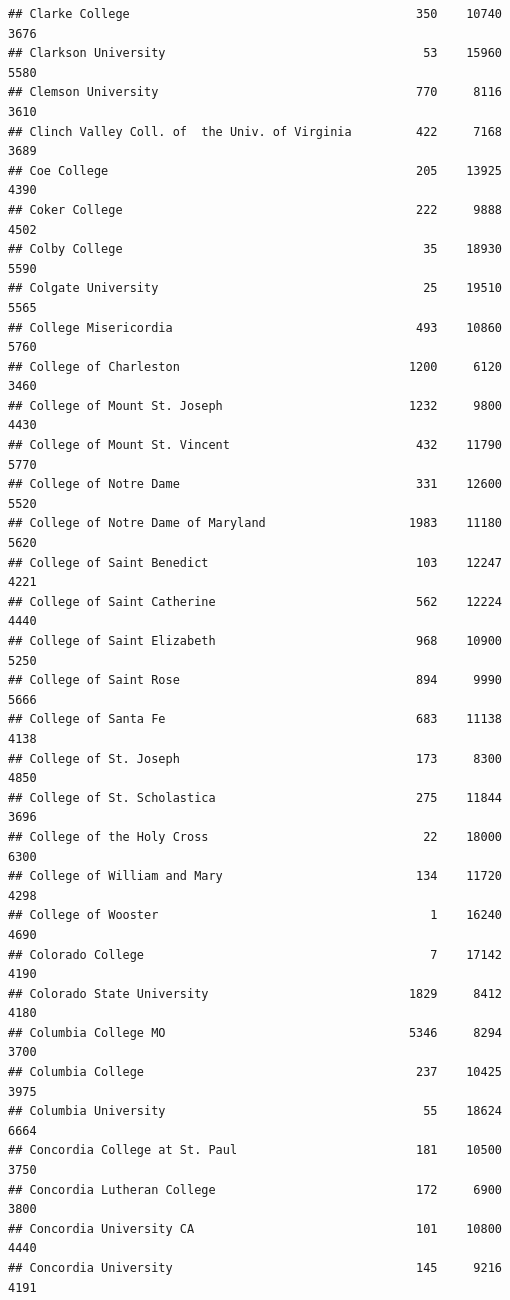\documentclass[
]{article}
\begin{document}
\begin{verbatim}
## Clarke College                                        350    10740       3676
## Clarkson University                                    53    15960       5580
## Clemson University                                    770     8116       3610
## Clinch Valley Coll. of  the Univ. of Virginia         422     7168       3689
## Coe College                                           205    13925       4390
## Coker College                                         222     9888       4502
## Colby College                                          35    18930       5590
## Colgate University                                     25    19510       5565
## College Misericordia                                  493    10860       5760
## College of Charleston                                1200     6120       3460
## College of Mount St. Joseph                          1232     9800       4430
## College of Mount St. Vincent                          432    11790       5770
## College of Notre Dame                                 331    12600       5520
## College of Notre Dame of Maryland                    1983    11180       5620
## College of Saint Benedict                             103    12247       4221
## College of Saint Catherine                            562    12224       4440
## College of Saint Elizabeth                            968    10900       5250
## College of Saint Rose                                 894     9990       5666
## College of Santa Fe                                   683    11138       4138
## College of St. Joseph                                 173     8300       4850
## College of St. Scholastica                            275    11844       3696
## College of the Holy Cross                              22    18000       6300
## College of William and Mary                           134    11720       4298
## College of Wooster                                      1    16240       4690
## Colorado College                                        7    17142       4190
## Colorado State University                            1829     8412       4180
## Columbia College MO                                  5346     8294       3700
## Columbia College                                      237    10425       3975
## Columbia University                                    55    18624       6664
## Concordia College at St. Paul                         181    10500       3750
## Concordia Lutheran College                            172     6900       3800
## Concordia University CA                               101    10800       4440
## Concordia University                                  145     9216       4191

\end{verbatim}
\end{document}
